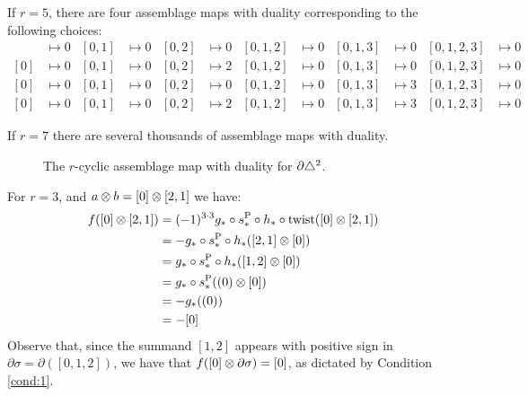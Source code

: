 \begin{example}\label{example:asymmetries5}
	If $r=5$, there are four assemblage maps with duality corresponding to the following choices:
	\begin{align*}
		[0]&\mapsto 0 & [0,1]&\mapsto 0 & [0,2]&\mapsto 0 & [0,1,2]&\mapsto 0 & [0,1,3] & \mapsto 0 & [0,1,2,3] & \mapsto 0 \\
		[0]&\mapsto 0 & [0,1]&\mapsto 0 & [0,2]&\mapsto 2 & [0,1,2]&\mapsto 0 & [0,1,3] & \mapsto 0 & [0,1,2,3] & \mapsto 0 \\
		[0]&\mapsto 0 & [0,1]&\mapsto 0 & [0,2]&\mapsto 0 & [0,1,2]&\mapsto 0 & [0,1,3] & \mapsto 3 & [0,1,2,3] & \mapsto 0 \\
		[0]&\mapsto 0 & [0,1]&\mapsto 0 & [0,2]&\mapsto 2 & [0,1,2]&\mapsto 0 & [0,1,3] & \mapsto 3 & [0,1,2,3] & \mapsto 0
	\end{align*}
\end{example}

If $r=7$ there are several thousands of assemblage maps with duality.

\begin{figure}
	\caption{The $r$-cyclic assemblage map with duality for $\partial \triangle^2$.}
\end{figure}

\begin{example}\label{example:f3_1}
	For $r=3$, and $a \otimes b = [0] \otimes [2,1]$ we have:
	\begin{align*}
		f([0] \otimes [2,1])
		&= (-1)^{3\cdot 3}g_*\circ s_*^{\operatorname{P}}\circ h_*\circ \operatorname{twist}([0] \otimes [2,1])
		\\
		&= -g_*\circ s_*^{\operatorname{P}}\circ h_*([2,1] \otimes [0])
		\\
		&= g_*\circ s_*^{\operatorname{P}}\circ h_*([1,2] \otimes [0])
		\\
		&= g_*\circ s_*^{\operatorname{P}}((0) \otimes [0])
		\\
		&= -g_*((0))
		\\
		&= -[0]
	\end{align*}
	Observe that, since the summand $[1,2]$ appears with positive sign in $\partial \sigma = \partial([0,1,2])$, we have that $f([0] \otimes \partial\sigma) = [0]$, as dictated by Condition \eqref{cond:1}.
\end{example}

